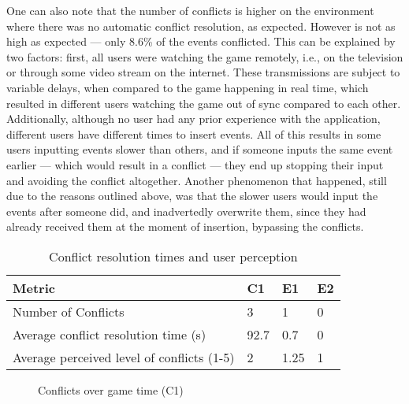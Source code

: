 One can also note that the number of conflicts is higher on the environment where there was no automatic conflict resolution, as expected. However is not as high as expected --- only 8.6\% of the events conflicted. This can be explained by two factors: first, all users were watching the game remotely, i.e., on the television or through some video stream on the internet. These transmissions are subject to variable delays, when compared to the game happening in real time, which resulted in different users watching the game out of sync compared to each other. Additionally, although no user had any prior experience with the application, different users have different times to insert events. All of this results in some users inputting events slower than others, and if someone inputs the same event earlier --- which would result in a conflict --- they end up stopping their input and avoiding the conflict altogether. Another phenomenon that happened, still due to the reasons outlined above, was that the slower users would input the events after someone did, and inadvertedly overwrite them, since they had already received them at the moment of insertion, bypassing the conflicts.

\begin{table}[h]
    \centering
    \caption{Conflict resolution times and user perception}
    \begin{tabular}{|l|l|l|l|}
        \hline
        \textbf{Metric}                        & \textbf{C1} & \textbf{E1} & \textbf{E2} \\ \hline
        Number of Conflicts                    & 3  & 1  & 0  \\ \hline
        Average conflict resolution time (s)   & 92.7  & 0.7  & 0  \\ \hline
        Average perceived level of conflicts (1-5)     & 2  & 1.25  & 1  \\ \hline
    \end{tabular}
    \label{table:num-conflicts-time-perception}
\end{table}

\begin{figure}[h]
    \centering
    \caption{Conflicts over game time (C1)}
    \label{chart:conflicts-over-time}
\end{figure}

